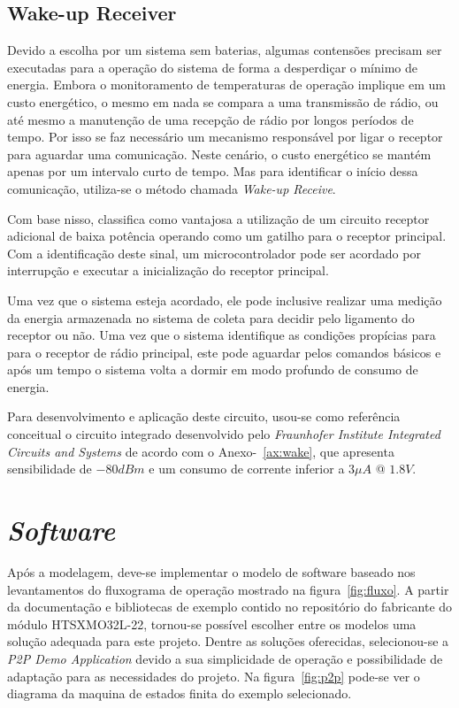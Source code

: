 \subsection{Wake-up Receiver}
Devido a escolha por um sistema sem baterias, algumas contensões precisam ser executadas para a operação do sistema de forma a desperdiçar o mínimo de energia. Embora o monitoramento de temperaturas de operação implique em um custo energético, o mesmo em nada se compara a uma transmissão de rádio, ou até mesmo a manutenção de uma recepção de rádio por longos períodos de tempo. Por isso se faz necessário um mecanismo responsável por ligar o receptor para aguardar uma comunicação. Neste cenário, o custo energético se mantém apenas por um intervalo curto de tempo. Mas para identificar o início dessa comunicação, utiliza-se o método chamada \textit{Wake-up Receive}. 

Com base nisso,  classifica como vantajosa a utilização de um circuito receptor adicional de baixa potência operando como um gatilho para o receptor principal. Com a identificação deste sinal, um microcontrolador pode ser acordado por interrupção e executar a inicialização do receptor principal.

Uma vez que o sistema esteja acordado, ele pode inclusive realizar uma medição da energia armazenada no sistema de coleta para decidir pelo ligamento do receptor ou não. Uma vez que o sistema identifique as condições propícias para para o receptor de rádio principal, este pode aguardar pelos comandos básicos e após um tempo o sistema volta a dormir em modo profundo de consumo de energia.

Para desenvolvimento e aplicação deste circuito, usou-se como referência conceitual o circuito integrado desenvolvido pelo \textit{Fraunhofer Institute Integrated Circuits and Systems} de acordo com o Anexo-~\ref{ax:wake}, que apresenta sensibilidade de $-80dBm$ e um consumo de corrente inferior a $3\mu A$ @ $1.8V$.
\section{\textit{Software}}
Após a modelagem, deve-se implementar o modelo de software baseado nos levantamentos do fluxograma de operação mostrado na figura~\ref{fig:fluxo}. A partir da documentação e bibliotecas de exemplo contido no repositório do fabricante do módulo HTSXMO32L-22, tornou-se possível escolher entre os modelos uma solução adequada para este projeto.
Dentre as soluções oferecidas, selecionou-se a \textit{P2P Demo Application} devido a sua simplicidade de operação e possibilidade de adaptação para as necessidades do projeto. Na figura~\ref{fig:p2p} pode-se ver o diagrama da maquina de estados finita do exemplo selecionado.

